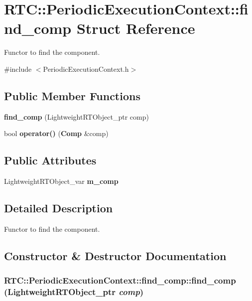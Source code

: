 \section{RTC::PeriodicExecutionContext::find\_\-comp Struct Reference}
\label{structRTC_1_1PeriodicExecutionContext_1_1find__comp}


Functor to find the component.  




{\ttfamily \#include $<$PeriodicExecutionContext.h$>$}

\subsection*{Public Member Functions}
\begin{DoxyCompactItemize}
\item 
{\bf find\_\-comp} (LightweightRTObject\_\-ptr comp)
\item 
bool {\bf operator()} ({\bf Comp} \&comp)
\end{DoxyCompactItemize}
\subsection*{Public Attributes}
\begin{DoxyCompactItemize}
\item 
LightweightRTObject\_\-var {\bf m\_\-comp}
\end{DoxyCompactItemize}


\subsection{Detailed Description}
Functor to find the component. 

\subsection{Constructor \& Destructor Documentation}
\subsubsection[{find\_\-comp}]{\setlength{\rightskip}{0pt plus 5cm}RTC::PeriodicExecutionContext::find\_\-comp::find\_\-comp (LightweightRTObject\_\-ptr {\em comp})\hspace{0.3cm}{\ttfamily  [inline]}}\label{structRTC_1_1PeriodicExecutionContext_1_1find__comp_ad122d50fe656d3cfa2d0a32a6a05b950}


